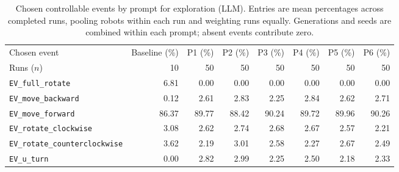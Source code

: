 \begin{table}[htbp]
\centering
\small
\caption{Chosen controllable events by prompt for exploration (LLM). Entries are mean percentages across completed runs, pooling robots within each run and weighting runs equally. Generations and seeds are combined within each prompt; absent events contribute zero.}
\label{tab:exploration-without-fixed-spec-prompt-events}
\begin{tabular}{lrrrrrrr}
\hline
Chosen event & Baseline (\%) & P1 (\%) & P2 (\%) & P3 (\%) & P4 (\%) & P5 (\%) & P6 (\%) \\
Runs ($n$) & 10 & 50 & 50 & 50 & 50 & 50 & 50 \\
\hline
\texttt{EV\_full\_rotate} & 6.81 & 0.00 & 0.00 & 0.00 & 0.00 & 0.00 & 0.00 \\
\texttt{EV\_move\_backward} & 0.12 & 2.61 & 2.83 & 2.25 & 2.84 & 2.62 & 2.71 \\
\texttt{EV\_move\_forward} & 86.37 & 89.77 & 88.42 & 90.24 & 89.72 & 89.96 & 90.26 \\
\texttt{EV\_rotate\_clockwise} & 3.08 & 2.62 & 2.74 & 2.68 & 2.67 & 2.57 & 2.21 \\
\texttt{EV\_rotate\_counterclockwise} & 3.62 & 2.19 & 3.01 & 2.58 & 2.27 & 2.67 & 2.49 \\
\texttt{EV\_u\_turn} & 0.00 & 2.82 & 2.99 & 2.25 & 2.50 & 2.18 & 2.33 \\
\hline
\end{tabular}
\end{table}
